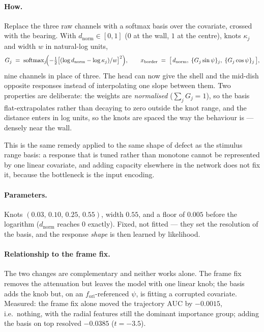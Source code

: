 \paragraph{How.} Replace the three raw channels with a softmax basis over the covariate, crossed
with the bearing. With $d_{\text{norm}}\in[0,1]$ ($0$ at the wall, $1$ at the centre), knots
$\kappa_j$ and width $w$ in natural-log units,
\[
G_j \;=\; \operatorname{softmax}_j\!\Bigl(-\tfrac12\bigl[(\log d_{\text{norm}}-\log\kappa_j)/w\bigr]^2\Bigr),
\qquad
x_{\text{border}} \;=\; \bigl[\,d_{\text{norm}},\;\{G_j\sin\psi\}_j,\;\{G_j\cos\psi\}_j\,\bigr],
\]
nine channels in place of three. The head can now give the shell and the mid-dish opposite
responses instead of interpolating one slope between them. Two properties are deliberate: the
weights are \emph{normalised} ($\sum_j G_j=1$), so the basis flat-extrapolates rather than decaying
to zero outside the knot range, and the distance enters in log units, so the knots are spaced the
way the behaviour is --- densely near the wall.

This is the same remedy applied to the same shape of defect as the stimulus range basis: a response
that is tuned rather than monotone cannot be represented by one linear covariate, and adding
capacity elsewhere in the network does not fix it, because the bottleneck is the input encoding.

\paragraph{Parameters.} Knots $(0.03,\,0.10,\,0.25,\,0.55)$, width $0.55$, and a floor of $0.005$
before the logarithm ($d_{\text{norm}}$ reaches $0$ exactly). Fixed, not fitted --- they set the
resolution of the basis, and the response \emph{shape} is then learned by likelihood.

\paragraph{Relationship to the frame fix.} The two changes are complementary and neither works
alone. The frame fix removes the attenuation but leaves the model with one linear knob; the basis
adds the knob but, on an $f_{\text{ori}}$-referenced $\psi$, is fitting a corrupted covariate.
Measured: the frame fix alone moved the trajectory AUC by $-0.0015$, i.e.\ nothing, with the radial
features still the dominant importance group; adding the basis on top resolved $-0.0385$
($t=-3.5$).



